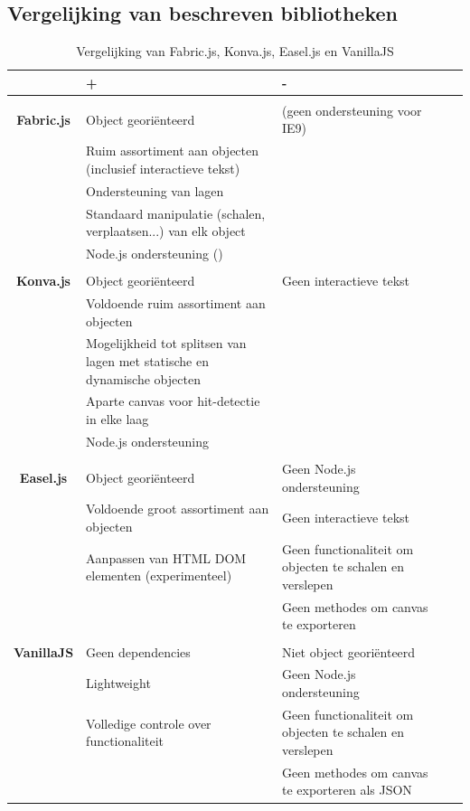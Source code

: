 \newpage
\subsection{Vergelijking van beschreven bibliotheken} \label{vergelijkingBibliotheken}

\begin{table}[ht!]
	\begin{center}
	\begin{tabular}[c]{clllc}
	\hline
	 & + & - \\
	\hline
						& & \\
	\textbf{Fabric.js}  & Object geori\"{e}nteerd &  (geen ondersteuning voor IE9)\\
						& Ruim assortiment aan objecten (inclusief interactieve tekst) &  \\
						& Ondersteuning van lagen &  \\
						& Standaard manipulatie (schalen, verplaatsen...) van elk object &  \\
						& Node.js ondersteuning () &  \\
						& & \\
	\textbf{Konva.js} 	& Object geori\"{e}nteerd & Geen interactieve tekst \\
						& Voldoende ruim assortiment aan objecten &  \\
						& Mogelijkheid tot splitsen van lagen met statische en dynamische objecten &  \\
						& Aparte canvas voor hit-detectie in elke laag &  \\
						& Node.js ondersteuning & \\
						& & \\
	\textbf{Easel.js} 	& Object geori\"{e}nteerd & Geen Node.js ondersteuning \\
						& Voldoende groot assortiment aan objecten & Geen interactieve tekst \\
						& Aanpassen van HTML DOM elementen (experimenteel)&  Geen functionaliteit om objecten te schalen en verslepen\\
						& &  Geen methodes om canvas te exporteren\\
						& & \\
	\textbf{VanillaJS} 	& Geen dependencies & Niet object geori\"{e}nteerd \\
						& Lightweight & Geen Node.js ondersteuning \\
						& Volledige controle over functionaliteit &  Geen functionaliteit om objecten te schalen en verslepen\\
						& &  Geen methodes om canvas te exporteren als JSON\\
	\hline
	\end{tabular}
	\caption{Vergelijking van Fabric.js, Konva.js, Easel.js en VanillaJS}
	\end{center}
	\end{table} 
	
